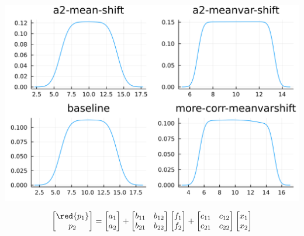 \documentclass[
  ignorenonframetext,
]{beamer}
\begin{document}
\begin{frame}{}
\protect\hypertarget{section-2}{}
\begin{center}\includegraphics[width=0.95\paperheight]{complexity_files/figure-beamer/unnamed-chunk-23-1} \end{center}

\[
\begin{bmatrix}
 \red{p_1} \\ p_2
\end{bmatrix} =
\begin{bmatrix}
 {a_1} \\ a_2
\end{bmatrix}
 + 
 \begin{bmatrix}
 b_{11} & b_{12} \\
 b_{21} & b_{22}
\end{bmatrix}
\begin{bmatrix}
 f_1 \\ f_2
\end{bmatrix}
+
 \begin{bmatrix}
 c_{11} & c_{12} \\
 c_{21} & c_{22}
\end{bmatrix}
\begin{bmatrix}
 x_1 \\ x_2
\end{bmatrix}
\]
\end{frame}
\end{document}
